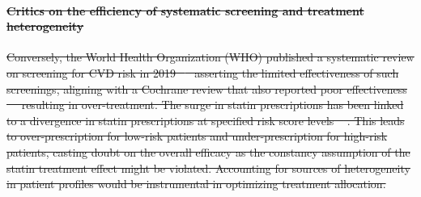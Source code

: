 \documentclass[10pt,letterpaper]{article}
\providecommand{\DIFdeltex}[1]{{\protect\color{red}\sout{#1}}}                      %
\providecommand{\DIFdelbegin}{} %
\providecommand{\DIFdelend}{} %
\providecommand{\DIFdel}[1]{\texorpdfstring{\DIFdeltex{#1}}{}} %
\newcommand{\DIFscaledelfig}{0.5}
\newlength{\DIFdelgraphicswidth} %
\newlength{\DIFdelgraphicsheight} %
\newcommand{\DIFdelincludegraphics}[2][]{%
\sbox{\DIFdelgraphicsbox}{\DIFOincludegraphics[#1]{#2}}%
\settoboxwidth{\DIFdelgraphicswidth}{\DIFdelgraphicsbox} %
\settoboxtotalheight{\DIFdelgraphicsheight}{\DIFdelgraphicsbox} %
\scalebox{\DIFscaledelfig}{%
\parbox[b]{\DIFdelgraphicswidth}{\usebox{\DIFdelgraphicsbox}\\[-\baselineskip] \rule{\DIFdelgraphicswidth}{0em}}\llap{\resizebox{\DIFdelgraphicswidth}{\DIFdelgraphicsheight}{%
\setlength{\unitlength}{\DIFdelgraphicswidth}%
\begin{picture}(1,1)%
\thicklines\linethickness{2pt} %
{\color[rgb]{1,0,0}\put(0,0){\framebox(1,1){}}}%
{\color[rgb]{1,0,0}\put(0,0){\line( 1,1){1}}}%
{\color[rgb]{1,0,0}\put(0,1){\line(1,-1){1}}}%
\end{picture}%
}\hspace*{3pt}}} %
} %
\DeclareRobustCommand{\DIFdelbegin}{\DIFOdelbegin \let\includegraphics\DIFdelincludegraphics} %
\DeclareRobustCommand{\DIFdelend}{\DIFOaddend \let\includegraphics\DIFOincludegraphics} %
\begin{document}
\DIFdelbegin \paragraph{\DIFdel{Critics on the efficiency of systematic screening and treatment heterogeneity}}
\addtocounter{paragraph}{-1}%
\DIFdel{Conversely, the World Health Organization (WHO) published a systematic review on screening for CVD risk in 2019 \mbox{%
\cite{eriksen2021effectiveness} }\hskip0pt%
asserting the limited effectiveness of such screenings, aligning with a Cochrane review that also reported poor effectiveness \mbox{%
\cite{krogsboll2012general} }\hskip0pt%
resulting in over-treatment. The surge in statin prescriptions has been linked to a divergence in statin prescriptions at specified risk score levels \mbox{%
\cite{van2013efficiency}}\hskip0pt%
. This leads to over-prescription for low-risk patients and under-prescription for high-risk patients, casting doubt on the overall efficacy as the constancy assumption of the statin treatment effect might be violated. Accounting for sources of heterogeneity in patient profiles would be instrumental in optimizing treatment allocation.
}\DIFdelend %
\end{document}
